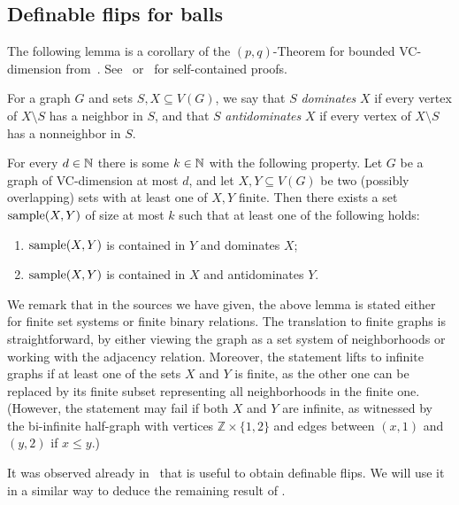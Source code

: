\subsection{Definable flips for balls}\label{sec:definable-flips-for-balls}

The following lemma is a corollary of the $(p,q)$-Theorem for bounded VC-dimension from~\cite{Matousek:p-q-theorem}.
See~\cite[Corollary~6.13]{simon_book} or~\cite[full version, Theorem~E.2]{flip-width} for self-contained proofs.

For a graph $G$ and sets $S,X\subseteq V(G)$, we say that $S$ \emph{dominates} $X$ if every vertex of $X \setminus S$ has a neighbor in $S$, and that $S$ \emph{antidominates} $X$ if every vertex of $X \setminus S$ has a nonneighbor in $S$.

\begin{lemma}\label{lem:vc-duality}
    For every $d\in\mathbb N$ there is some $k\in\mathbb N$ with the following property.
    Let $G$ be a graph of VC-dimension at most $d$, and let $X,Y\subseteq V(G)$ be two (possibly overlapping) sets with at least one of $X,Y$ finite.
    Then there exists a set $\mathrm{sample}(X,Y)$ of size at most $k$ such that at least one of the following holds:
    \begin{enumerate}
        \item $\mathrm{sample}(X,Y)$ is contained in $Y$ and dominates $X$;
        \item $\mathrm{sample}(X,Y)$ is  contained in $X$ and antidominates $Y$.
    \end{enumerate}
\end{lemma}
We remark that in the sources we have given, the above lemma is stated either for finite set systems or finite binary relations.
The translation to finite graphs is straightforward, by either viewing the graph as a set system of neighborhoods or working with the adjacency relation.
Moreover, the statement lifts to infinite graphs if at least one of the sets $X$ and $Y$ is finite, as the other one can be replaced by its finite subset representing all neighborhoods in the  finite one.
(However, the statement may fail if both $X$ and $Y$ are infinite, as witnessed by the bi-infinite half-graph with vertices $\mathbb{Z} \times \{1,2\}$ and edges between $(x,1)$ and $(y,2)$ if $x\leq y$.)

It was observed already in~\cite{DBLP:conf/lics/BonnetDGKMST22} that  is useful to obtain definable flips.
We will use it in a similar way to deduce the remaining result of .


